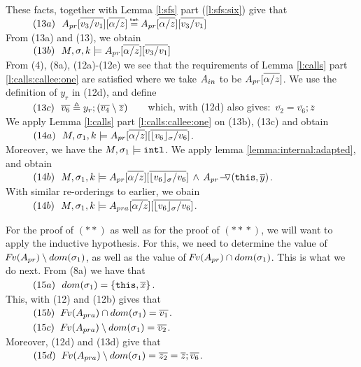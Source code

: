 \begin{description}
These facts, together with   Lemma \ref{l:sfs}  part (\ref{l:sfs:six}) give that\\
$\SPS (13a) \ \    \Apr[\overline{v_3/v_1}][\overline{\alpha/z}] \txteq   \Apr[\overline{\alpha/z}]  [\overline{v_3/v_1}] $\\
From (13a) and (13), we obtain
\\
$\strut \ \ \hspace{0.5cm} \ \  (13b) \ \     M,\sigma ,{k} \models { A_{pr}[\overline{\alpha/z}]  [\overline{v_3/v_1}] } $
\\
From (4), (8a), (12a)-(12e)  we see that the requirements  %
 of Lemma \ref{l:calls}  part  \ref{l:calls:callee:one} are satisfied where we take  $A_{in}$ to be $A_{pr}[\overline{\alpha/z}]$.
 We use the definition of $y_r$ in (12d), and define\\
$\strut \ \ \hspace{0.5cm} \ \  (13c) \ \ \overline {v_6} \triangleq  y_r;  (\overline {v_4}\setminus \overline{z})$\ \ \ \ which, with (12d) also gives:\ $ \overline {v_2} = \overline{v_6}; \overline{z}$
\\
We apply   Lemma   \ref{l:calls} part \ref{l:calls:callee:one} on (13b), (13c)  and  obtain\\
$\strut \ \ \hspace{0.5cm} \ \  (14a) \ \  M,\sigma_1 ,{k} \models { A_{pr}[\overline{\alpha/z}][ \overline {  \lfloor v_6 \rfloor_{\sigma}/v_6}] }  $. \\
Moreover, we have the $M, \sigma_1 \models \mbox{\normalfont{\texttt{intl}}}$. We apply lemma \ref{lemma:internal:adapted}, and obtain\\
$\strut \ \ \hspace{0.5cm} \ \  (14b) \ \  M,\sigma_1 ,{k} \models { A_{pr}[\overline{\alpha/z}][ \overline {  \lfloor v_6 \rfloor_{\sigma}/v_6}] 
          \, \wedge\,  
          { \ensuremath{ A_{pr} \!-\!\!\!\,\!{\triangledown} (\mbox{\normalfont{\texttt{this}}}, \overline y)}   
       } }  $. \\
 With similar re-orderings to earlier, we obain\\
$\strut \ \ \hspace{0.5cm} \ \  (14b) \ \  M,\sigma_1 ,{k} \models {A_{pra}[\overline{\alpha/z}][\overline{\lfloor v_6 \rfloor_{\sigma}/v_6}]} $. 

\vspace{.1cm}

For the proof of $(**)$ as well as for the proof of $(*\!*\!*)$, we will want to apply the inductive hypothesis.   For this, we need to determine the value of  
${\hspace{-1pt}F\hspace{-1pt}}v(A_{pr})  \setminus dom(\sigma_1)$, as well as the value of ${\hspace{-1pt}F\hspace{-1pt}}v(A_{pr})  \cap dom(\sigma_1)$. 
  This is what we do next. From (8a) we have that\\
$\strut \ \ \hspace{0.5cm} \ \  (15a) \ \  dom(\sigma_1)=\{ \mbox{\normalfont{\texttt{this}}}, \overline x \}$.\\
This, with (12)  and (12b)  gives  that\\
$\strut \ \ \hspace{0.5cm} \ \  (15b) \ \ {\hspace{-1pt}F\hspace{-1pt}}v(A_{pra})\cap dom(\sigma_1)= \overline {v_1}$.\\
$\strut \ \ \hspace{0.5cm} \ \  (15c) \ \  {\hspace{-1pt}F\hspace{-1pt}}v(A_{pra})  \setminus dom(\sigma_1) = \overline {v_2}$. \\
Moreover, (12d) and (13d) give that\\
$\strut \ \ \hspace{0.5cm} \ \  (15d) \ \  {\hspace{-1pt}F\hspace{-1pt}}v(A_{pra})  \setminus dom(\sigma_1) = \overline{z_2} = \overline {z}; \overline{v_6}$.


\end{description}
